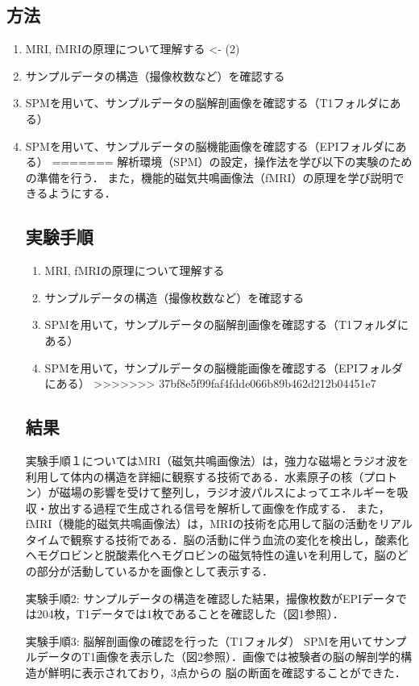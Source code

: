 \documentclass{jlreq}
\begin{document}
\subsection{方法}
\begin{enumerate}
    \item MRI, fMRIの原理について理解する <- (2)
    \item サンプルデータの構造（撮像枚数など）を確認する
    \item SPMを用いて、サンプルデータの脳解剖画像を確認する（T1フォルダにある）
    \item SPMを用いて、サンプルデータの脳機能画像を確認する（EPIフォルダにある）
=======
解析環境（SPM）の設定，操作法を学び以下の実験のための準備を行う．
また，機能的磁気共鳴画像法（fMRI）の原理を学び説明できるようにする．
\subsection{実験手順}
\begin{enumerate}
    \item MRI, fMRIの原理について理解する 
    \item サンプルデータの構造（撮像枚数など）を確認する
    \item SPMを用いて，サンプルデータの脳解剖画像を確認する（T1フォルダにある）
    \item SPMを用いて，サンプルデータの脳機能画像を確認する（EPIフォルダにある）
>>>>>>> 37bf8e5f99faf4fdde066b89b462d212b04451e7
\end{enumerate}
\subsection{結果}
実験手順１についてはMRI（磁気共鳴画像法）は，強力な磁場とラジオ波を利用して体内の構造を詳細に観察する技術である．水素原子の核（プロトン）が磁場の影響を受けて整列し，ラジオ波パルスによってエネルギーを吸収・放出する過程で生成される信号を解析して画像を作成する．
また，fMRI（機能的磁気共鳴画像法）は，MRIの技術を応用して脳の活動をリアルタイムで観察する技術である．脳の活動に伴う血流の変化を検出し，酸素化ヘモグロビンと脱酸素化ヘモグロビンの磁気特性の違いを利用して，脳のどの部分が活動しているかを画像として表示する．

実験手順2:
サンプルデータの構造を確認した結果，撮像枚数がEPIデータでは204枚，T1データでは1枚であることを確認した（図1参照）．


実験手順3: 脳解剖画像の確認を行った（T1フォルダ）
SPMを用いてサンプルデータのT1画像を表示した（図2参照）．画像では被験者の脳の解剖学的構造が鮮明に表示されており，3点からの
脳の断面を確認することができた．



\end{enumerate}
\end{document}
